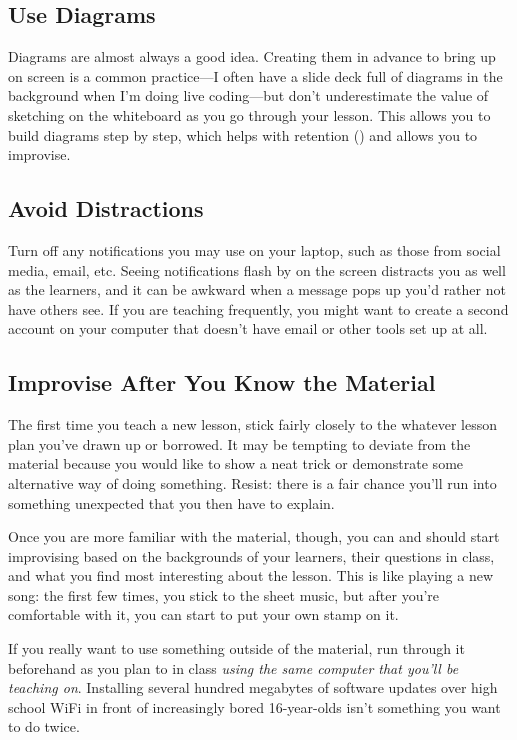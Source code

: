 \subsection*{Use Diagrams}

Diagrams are almost always a good idea.  Creating them in advance to
bring up on screen is a common practice---I often have a slide deck
full of diagrams in the background when I'm doing live coding---but
don't underestimate the value of sketching on the whiteboard as you go
through your lesson. This allows you to build diagrams step by step,
which helps with retention () and
allows you to improvise.

\subsection*{Avoid Distractions}

Turn off any notifications you may use on your laptop, such as those
from social media, email, etc. Seeing notifications flash by on the
screen distracts you as well as the learners, and it can be awkward
when a message pops up you'd rather not have others see.  If you are
teaching frequently, you might want to create a second account on your
computer that doesn't have email or other tools set up at all.

\subsection*{Improvise After You Know the Material}

The first time you teach a new lesson, stick fairly closely to the
whatever lesson plan you've drawn up or borrowed.  It may be tempting
to deviate from the material because you would like to show a neat
trick or demonstrate some alternative way of doing something.  Resist:
there is a fair chance you'll run into something unexpected that you
then have to explain.

Once you are more familiar with the material, though, you can and
should start improvising based on the backgrounds of your learners,
their questions in class, and what you find most interesting about the
lesson.  This is like playing a new song: the first few times, you
stick to the sheet music, but after you're comfortable with it, you
can start to put your own stamp on it.

If you really want to use something outside of the material, run
through it beforehand as you plan to in class \emph{using the same
  computer that you'll be teaching on}.  Installing several hundred
megabytes of software updates over high school WiFi in front of
increasingly bored 16-year-olds isn't something you want to do twice.


